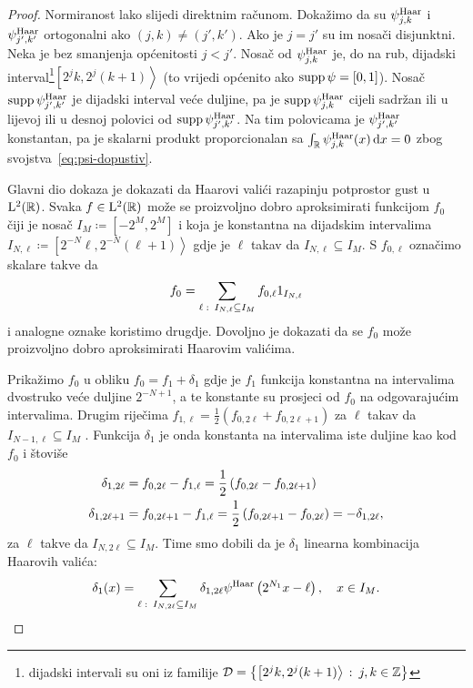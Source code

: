 \documentclass[main.tex]{subfiles}
\begin{document}
\renewcommand{\fusnota}{\footnote{dijadski intervali
su oni iz familije \( \mathcal D = \left\{ \left[ 2^jk, 2^j(k+1) \right\rangle \st j,k\in\Z \right\} \)}}
\begin{proof}
	Normiranost lako slijedi direktnim računom. Dokažimo da su
	\( \psi^{\mathrm{Haar}}_{j,k} \) i \( \psi^{\mathrm{Haar}}_{j',k'} \) ortogonalni ako \( (j,k) \neq (j',k') \).
	Ako je \( j=j' \) su im nosači disjunktni. Neka je bez smanjenja općenitosti
	\( j < j' \). Nosač od
	\( \psi^{\mathrm{Haar}}_{j,k} \) je, do na rub, dijadski interval\fusnota \( \left[ 2^jk,2^j(k+1) \right\rangle \)
	(to vrijedi općenito ako \( \operatorname{supp} \psi = \left[ 0,1 \right] \)).
	Nosač \( \operatorname{supp} \psi^{\mathrm{Haar}}_{j',k'} \) je dijadski interval veće duljine, pa je
	\( \operatorname{supp} \psi^{\mathrm{Haar}}_{j,k} \) cijeli sadržan ili u lijevoj ili u desnoj polovici
	od \( \operatorname{supp} \psi^{\mathrm{Haar}}_{j',k'} \). Na tim polovicama je \( \psi^{\mathrm{Haar}}_{j',k'} \) konstantan,
	pa je skalarni produkt proporcionalan sa \( \int_{\mathbb{R}} \psi^{\mathrm{Haar}}_{j,k}(x) \,\mathrm d x = 0 \)
	zbog svojstva~\eqref{eq:psi-dopustiv}.

	Glavni dio dokaza je dokazati da Haarovi valići
	razapinju potprostor gust u \( \mathrm{L}^2(\mathbb{R}) \). Svaka \( f \in \mathrm{L}^2(\mathbb{R}) \)
	može se proizvoljno dobro aproksimirati funkcijom \( f_0 \)
	čiji je nosač \( I_{M} \coloneq \left[ -2^{M},2^{M} \right] \)
	i koja je konstantna na dijadskim intervalima
	\( I_{N,\ell} \coloneq \left[ 2^{-N}\ell, 2^{-N}(\ell+1) \right\rangle \)
	gdje je \( \ell \) takav da \( I_{N,\ell} \subseteq I_M \).
	S \( f_{0, \ell} \) označimo skalare takve da
	\begin{equation}
		f_0 = \sum_{\ell \, \colon \, I_{N,\ell} \subseteq I_M} f_{0,\ell} 1_{I_{N,\ell}}
	\end{equation}
	i analogne oznake koristimo drugdje.
	Dovoljno je dokazati
	da se \( f_0 \) može proizvoljno dobro aproksimirati Haarovim valićima.

	Prikažimo \( f_0 \) u obliku \( f_0 = f_1 + \delta_1 \) gdje je
	\( f_1 \) funkcija konstantna na intervalima dvostruko veće duljine
	\( 2^{-N+1} \), a te konstante su prosjeci od \( f_0 \) na
	odgovarajućim intervalima. Drugim riječima
	\( f_{1, \ell} = \frac 12 \left( f_{0,2\ell} + f_{0,2\ell + 1} \right) \)
	za \( \ell \) takav da \( I_{N-1,\ell} \subseteq I_M \) .
	Funkcija \( \delta_1 \) je onda konstanta na intervalima iste duljine kao kod \( f_0 \)
	i štoviše
	\begin{align}
		\footnotesize
		\delta_{1, 2\ell}  & = f_{0,2\ell} - f_{1,\ell} = \frac 12 \left( f_{0,2\ell} - f_{0,2\ell + 1} \right)
		\\
		\delta_{1,2\ell+1} & = f_{0,2\ell+1} - f_{1,\ell}
		= \frac 12 \left( f_{0,2\ell+1} - f_{0,2\ell} \right) = -\delta_{1,2\ell},
	\end{align}
	za \( \ell \) takve da \( I_{N,2\ell} \subseteq I_M \).
	Time smo dobili da je \( \delta_1 \) linearna kombinacija Haarovih valića:
	\begin{equation}
		\delta_1(x) = \sum_{\ell \, \colon \, I_{N,2\ell} \subseteq I_M} \delta_{1,2\ell}
		\psi^{\mathrm{Haar}}\left( 2^{N_1}x-\ell \right), \quad x \in I_M.
	\end{equation}


\end{proof}
\end{document}
